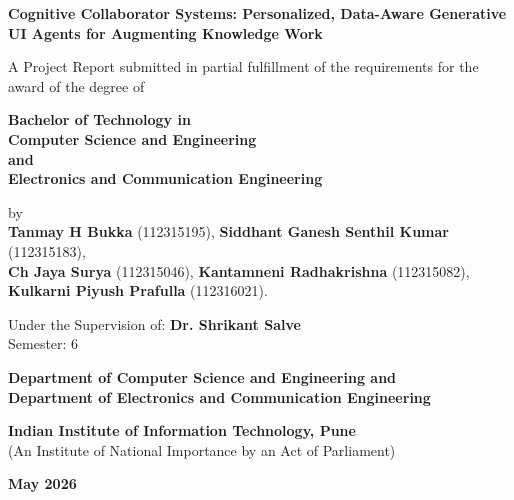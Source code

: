 \documentclass[12pt, a4paper]{report}
\begin{document}
\begin{titlepage}
    \centering
    \vspace*{0.5cm}
    
    {\bfseries\fontsize{24}{30}\selectfont Cognitive Collaborator Systems: Personalized, Data-Aware Generative UI Agents for Augmenting Knowledge Work \par}
    
    \vspace{0.7cm}
    
    {\fontsize{12}{15}\selectfont A Project Report submitted in partial fulfillment of the requirements for the award of the degree of \par}

    {\bfseries Bachelor of Technology in \\ Computer Science and Engineering \\ and \\ Electronics and Communication Engineering \par}
    
    
    by\\

    \textbf{Tanmay H Bukka} (112315195), \textbf{Siddhant Ganesh Senthil Kumar} (112315183), \\
    \textbf{Ch Jaya Surya} (112315046), \textbf{Kantamneni Radhakrishna} (112315082), \\
    \textbf{Kulkarni Piyush Prafulla} (112316021).

    Under the Supervision of: \textbf{Dr. Shrikant Salve} \\
    Semester: 6
    

    
    \textbf{Department of Computer Science and Engineering and \\ Department of Electronics and Communication Engineering}
    
    \vspace{0.5cm}
    
    \textbf{Indian Institute of Information Technology, Pune}\\
    (An Institute of National Importance by an Act of Parliament)
    

    \textbf{May 2026}
    
\end{titlepage}
\end{document}
